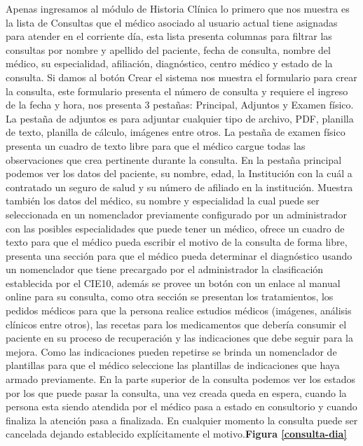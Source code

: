 Apenas ingresamos al módulo de Historia Clínica lo primero que nos muestra es la lista de Consultas que el médico asociado al usuario actual tiene asignadas para atender en el corriente día, esta lista presenta columnas para filtrar las consultas por nombre y apellido del paciente, fecha de consulta, nombre del médico, su especialidad, afiliación, diagnóstico, centro médico y estado de la consulta.
Si damos al botón Crear el sistema nos muestra el formulario para crear la consulta, este formulario presenta el número de consulta y requiere el ingreso de la fecha y hora, nos presenta 3 pestañas: Principal, Adjuntos y Examen físico. 
La pestaña de adjuntos es para adjuntar cualquier tipo de archivo, PDF, planilla de texto, planilla de cálculo, imágenes entre otros.
La pestaña de examen físico presenta un cuadro de texto libre para que el médico cargue todas las observaciones que crea pertinente durante la consulta.
En la pestaña principal podemos ver los datos del paciente, su nombre, edad, la Institución con la cuál a contratado un seguro de salud y su número de afiliado en la institución. Muestra también los datos del médico, su nombre y especialidad la cual puede ser seleccionada en un nomenclador previamente configurado por un administrador con las posibles especialidades que puede tener un médico, ofrece un cuadro de texto para que el médico pueda escribir el motivo de la consulta de forma libre, presenta una sección para que el médico pueda determinar el diagnóstico usando un nomenclador que tiene precargado por el administrador la clasificación establecida por el CIE10, además se provee un botón con un enlace al manual online para su consulta, como otra sección se presentan los tratamientos, los pedidos médicos para que la persona realice estudios médicos (imágenes, análisis clínicos entre otros), las recetas para los medicamentos que debería consumir el paciente en su proceso de recuperación y las indicaciones que debe seguir para la mejora. Como las indicaciones pueden repetirse se brinda un nomenclador de plantillas para que el médico seleccione las plantillas de indicaciones que haya armado previamente. En la parte superior de la consulta podemos ver los estados por los que puede pasar la consulta, una vez creada queda en espera, cuando la persona esta siendo atendida por el médico pasa a estado en consultorio y cuando finaliza la atención pasa a finalizada. En cualquier momento la consulta puede ser cancelada dejando establecido explícitamente el motivo.\textbf{Figura \ref{consulta-dia}}

